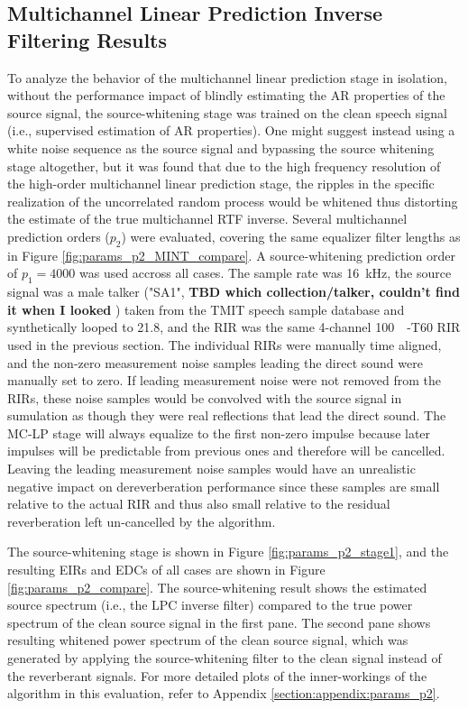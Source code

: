 \subsection{Multichannel Linear Prediction Inverse Filtering Results} \label{section:params_p2_MC_LP} 

To analyze the behavior of the multichannel linear prediction stage in isolation, without the performance impact of blindly estimating the AR properties of the source signal, the source-whitening stage was trained on the clean speech signal (i.e., supervised estimation of AR properties). One might suggest instead using a white noise sequence as the source signal and bypassing the source whitening stage altogether, but it was found that due to the high frequency resolution of the high-order multichannel linear prediction stage, the ripples in the specific realization of the uncorrelated random process would be whitened thus distorting the estimate of the true multichannel RTF inverse. Several multichannel prediction orders ($p_2$) were evaluated, covering the same equalizer filter lengths as in Figure \ref{fig:params_p2_MINT_compare}. A source-whitening prediction order of $p_1 = 4000$ was used accross all cases. The sample rate was \qty{16}{\kilo\hertz}, the source signal was a male talker ("SA1",  \textbf{TBD which collection/talker, couldn't find it when I looked} ) taken from the TMIT speech sample database \citep{garofolo1993timit} and synthetically looped to \qty{21.8}{\sec}, and the RIR was the same 4-channel \qty{100}{\milli\sec}-T60 RIR used in the previous section. The individual RIRs were manually time aligned, and the non-zero measurement noise samples leading the direct sound were manually set to zero. If leading measurement noise were not removed from the RIRs, these noise samples would be convolved with the source signal in sumulation as though they were real reflections that lead the direct sound. The MC-LP stage will always equalize to the first non-zero impulse because later impulses will be predictable from previous ones and therefore will be cancelled. Leaving the leading measurement noise samples would have an unrealistic negative impact on dereverberation performance since these samples are small relative to the actual RIR and thus also small relative to the residual reverberation left un-cancelled by the algorithm.

The source-whitening stage is shown in Figure \ref{fig:params_p2_stage1}, and the resulting EIRs and EDCs of all cases are shown in Figure \ref{fig:params_p2_compare}. The source-whitening result shows the estimated source spectrum (i.e., the LPC inverse filter) compared to the true power spectrum of the clean source signal in the first pane. The second pane shows resulting whitened power spectrum of the clean source signal, which was generated by applying the source-whitening filter to the clean signal instead of the reverberant signals.  For more detailed plots of the inner-workings of the algorithm in this evaluation, refer to Appendix \ref{section:appendix:params_p2}. 

